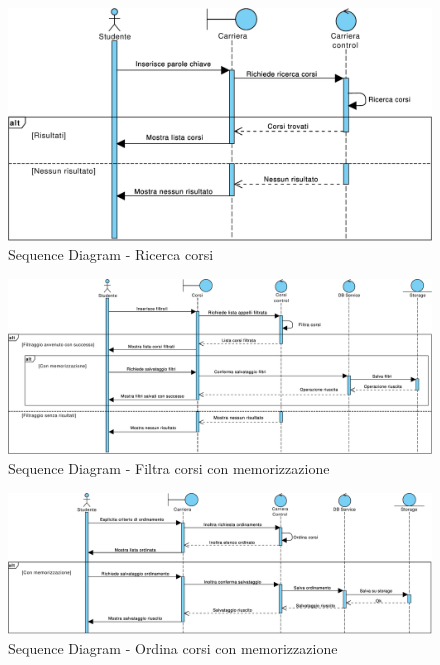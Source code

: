 \begin{figure}
	\centering
	\includegraphics[width=6.5in]{imgs/gruppo1/sequence_diagrams/SD2_ricerca_corsi.pdf}
	\caption{Sequence Diagram - Ricerca corsi}
	\label{diag:ricercaCorsiSD}
\end{figure}
\newpage

\begin{figure}
	\centering
	\includegraphics[width=6.5in]{imgs/gruppo1/sequence_diagrams/SD3_filtra_corsi_con_memorizzazione.pdf}
	\caption{Sequence Diagram - Filtra corsi con memorizzazione}
	\label{diag:filtraCorsiConMemSD}
\end{figure}

\begin{figure}
	\centering
	\includegraphics[width=6.5in]{imgs/gruppo1/sequence_diagrams/SD4_ordina_corsi_con_memorizzazione.pdf}
	\caption{Sequence Diagram - Ordina corsi con memorizzazione}
	\label{diag:ordinaCorsiConMemSD}
\end{figure}
\newpage
\clearpage

